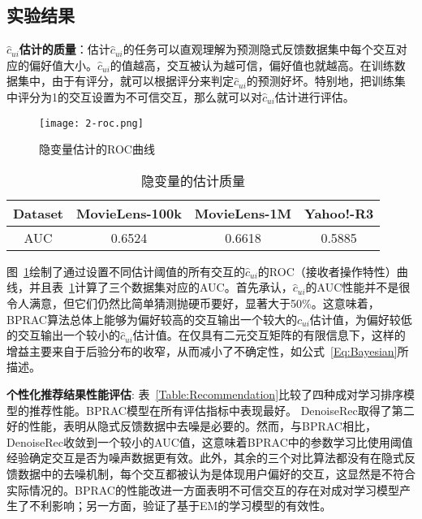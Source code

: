 \subsection{实验结果}
\textbf{$\hat{c}_{ui}$估计的质量}：估计$\hat{c}_{ui}$的任务可以直观理解为预测隐式反馈数据集中每个交互对应的偏好值大小。$\hat{c}_{ui}$的值越高，交互被认为越可信，偏好值也就越高。在训练数据集中，由于有评分，就可以根据评分来判定$\hat{c}_{ui}$的预测好坏。特别地，把训练集中评分为1的交互设置为不可信交互，那么就可以对$\hat{c}_{ui}$估计进行评估。
\begin{figure}[!]
	\centering
	\texttt{[image: 2-roc.png]}
	\caption{隐变量估计的ROC曲线}
	\label{Fig:ROC}
\end{figure}
\begin{table}[!]
	\centering
	\caption{隐变量的估计质量}\label{Table:ActionRecognition}
	\begin{tabular}{cccc}
		\toprule[1.2pt]
		Dataset            & MovieLens-100k &	MovieLens-1M & Yahoo!-R3 \\ \hline
		AUC               & 0.6524       &  0.6618        & 0.5885 \\
		\bottomrule[1.2pt]
	\end{tabular}
\end{table}
图~\ref{Fig:ROC}绘制了通过设置不同估计阈值的所有交互的$\hat{c}_{ui}$的ROC（接收者操作特性）曲线，并且表~\ref{Table:ActionRecognition}计算了三个数据集对应的AUC。首先承认，$\hat{c}_{ui}$的AUC性能并不是很令人满意，但它们仍然比简单猜测抛硬币要好，显著大于50\%。这意味着，BPRAC算法总体上能够为偏好较高的交互输出一个较大的$\hat{c}_{ui}$估计值，为偏好较低的交互输出一个较小的$\hat{c}_{ui}$估计值。在仅具有二元交互矩阵的有限信息下，这样的增益主要来自于后验分布的收窄，从而减小了不确定性，如公式~\eqref{Eq:Bayesian}所描述。
\par 
\textbf{个性化推荐结果性能评估}: 表~\ref{Table:Recommendation}比较了四种成对学习排序模型的推荐性能。\textsf{BPRAC}模型在所有评估指标中表现最好。 \textsf{DenoiseRec}取得了第二好的性能，表明从隐式反馈数据中去噪是必要的。然而，与\textsf{BPRAC}相比，\textsf{DenoiseRec}收敛到一个较小的AUC值，这意味着BPRAC中的参数学习比使用阈值经验确定交互是否为噪声数据更有效。此外，其余的三个对比算法都没有在隐式反馈数据中的去噪机制，每个交互都被认为是体现用户偏好的交互，这显然是不符合实际情况的。\textsf{BPRAC}的性能改进一方面表明不可信交互的存在对成对学习模型产生了不利影响；另一方面，验证了基于EM的学习模型的有效性。
